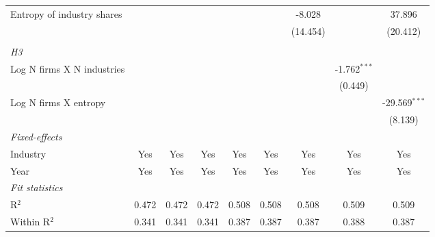 \begin{tabular}{lcccccccc}
   Entropy of industry shares                            &                 &                 &                 &                  &                  & -8.028           &                  & 37.896\\   
                                                         &                 &                 &                 &                  &                  & (14.454)         &                  & (20.412)\\   
\hdashline %
\\[0.1ex] %
\emph{H3} \\ 
   Log N firms X N industries                            &                 &                 &                 &                  &                  &                  & -1.762$^{***}$   &   \\   
                                                         &                 &                 &                 &                  &                  &                  & (0.449)          &   \\   
   Log N firms X entropy                                 &                 &                 &                 &                  &                  &                  &                  & -29.569$^{***}$\\   
                                                         &                 &                 &                 &                  &                  &                  &                  & (8.139)\\   
   \midrule
   \emph{Fixed-effects}\\
   Industry                                              & Yes             & Yes             & Yes             & Yes              & Yes              & Yes              & Yes              & Yes\\  
   Year                                                  & Yes             & Yes             & Yes             & Yes              & Yes              & Yes              & Yes              & Yes\\  
   \midrule
   \emph{Fit statistics}\\
   R$^2$                                                 & 0.472           & 0.472           & 0.472           & 0.508            & 0.508            & 0.508            & 0.509            & 0.509\\  
   Within R$^2$                                          & 0.341           & 0.341           & 0.341           & 0.387            & 0.387            & 0.387            & 0.388            & 0.387\\  

\end{tabular}
